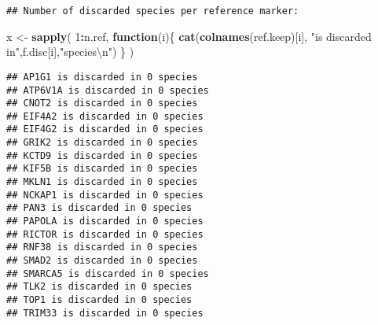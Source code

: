 \documentclass[]{article}
\newenvironment{Shaded}{\begin{snugshade}}{\end{snugshade}}
\newcommand{\KeywordTok}[1]{\textcolor[rgb]{0.13,0.29,0.53}{\textbf{#1}}}
\newcommand{\DecValTok}[1]{\textcolor[rgb]{0.00,0.00,0.81}{#1}}
\newcommand{\CharTok}[1]{\textcolor[rgb]{0.31,0.60,0.02}{#1}}
\newcommand{\StringTok}[1]{\textcolor[rgb]{0.31,0.60,0.02}{#1}}
\newcommand{\ControlFlowTok}[1]{\textcolor[rgb]{0.13,0.29,0.53}{\textbf{#1}}}
\newcommand{\OperatorTok}[1]{\textcolor[rgb]{0.81,0.36,0.00}{\textbf{#1}}}
\newcommand{\NormalTok}[1]{#1}
\begin{document}
\begin{verbatim}
## Number of discarded species per reference marker:
\end{verbatim}

\begin{Shaded}
\begin{Highlighting}[]
\NormalTok{x <-}\StringTok{ }\KeywordTok{sapply}\NormalTok{( }\DecValTok{1}\OperatorTok{:}\NormalTok{n.ref, }\ControlFlowTok{function}\NormalTok{(i)\{}
  \KeywordTok{cat}\NormalTok{(}\KeywordTok{colnames}\NormalTok{(ref.keep)[i], }\StringTok{"is discarded in"}\NormalTok{,f.disc[i],}\StringTok{"species}\CharTok{\textbackslash{}n}\StringTok{"}\NormalTok{)}
\NormalTok{\} )}
\end{Highlighting}
\end{Shaded}

\begin{verbatim}
## AP1G1 is discarded in 0 species
## ATP6V1A is discarded in 0 species
## CNOT2 is discarded in 0 species
## EIF4A2 is discarded in 0 species
## EIF4G2 is discarded in 0 species
## GRIK2 is discarded in 0 species
## KCTD9 is discarded in 0 species
## KIF5B is discarded in 0 species
## MKLN1 is discarded in 0 species
## NCKAP1 is discarded in 0 species
## PAN3 is discarded in 0 species
## PAPOLA is discarded in 0 species
## RICTOR is discarded in 0 species
## RNF38 is discarded in 0 species
## SMAD2 is discarded in 0 species
## SMARCA5 is discarded in 0 species
## TLK2 is discarded in 0 species
## TOP1 is discarded in 0 species
## TRIM33 is discarded in 0 species
\end{verbatim}
\end{document}
